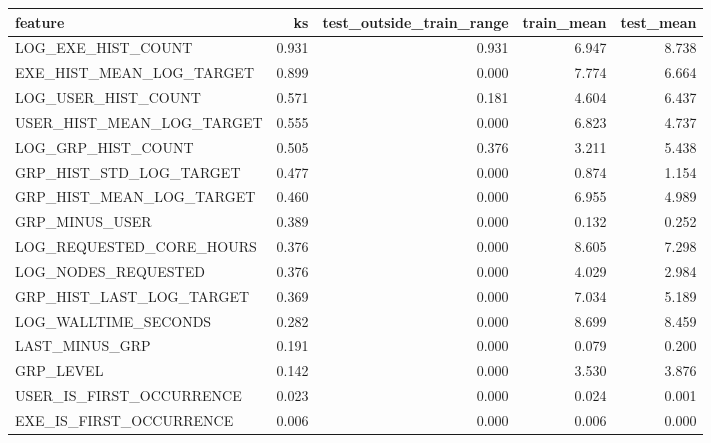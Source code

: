 \begin{tabular}{lrrrr}
\toprule
feature & ks & test_outside_train_range & train_mean & test_mean \\
\midrule
LOG_EXE_HIST_COUNT & 0.931 & 0.931 & 6.947 & 8.738 \\
EXE_HIST_MEAN_LOG_TARGET & 0.899 & 0.000 & 7.774 & 6.664 \\
LOG_USER_HIST_COUNT & 0.571 & 0.181 & 4.604 & 6.437 \\
USER_HIST_MEAN_LOG_TARGET & 0.555 & 0.000 & 6.823 & 4.737 \\
LOG_GRP_HIST_COUNT & 0.505 & 0.376 & 3.211 & 5.438 \\
GRP_HIST_STD_LOG_TARGET & 0.477 & 0.000 & 0.874 & 1.154 \\
GRP_HIST_MEAN_LOG_TARGET & 0.460 & 0.000 & 6.955 & 4.989 \\
GRP_MINUS_USER & 0.389 & 0.000 & 0.132 & 0.252 \\
LOG_REQUESTED_CORE_HOURS & 0.376 & 0.000 & 8.605 & 7.298 \\
LOG_NODES_REQUESTED & 0.376 & 0.000 & 4.029 & 2.984 \\
GRP_HIST_LAST_LOG_TARGET & 0.369 & 0.000 & 7.034 & 5.189 \\
LOG_WALLTIME_SECONDS & 0.282 & 0.000 & 8.699 & 8.459 \\
LAST_MINUS_GRP & 0.191 & 0.000 & 0.079 & 0.200 \\
GRP_LEVEL & 0.142 & 0.000 & 3.530 & 3.876 \\
USER_IS_FIRST_OCCURRENCE & 0.023 & 0.000 & 0.024 & 0.001 \\
EXE_IS_FIRST_OCCURRENCE & 0.006 & 0.000 & 0.006 & 0.000 \\
\bottomrule
\end{tabular}
